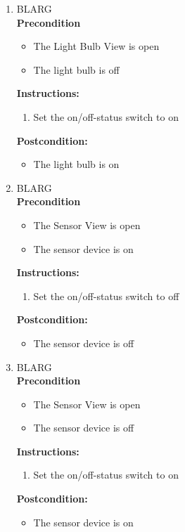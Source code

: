 \documentclass[a4paper]{article}
\newlength{\testlabellength}
\newenvironment{testlist}{\begin{enumerate}[label=\bfseries Instruction \thesubsection.\arabic* , labelindent=0pt, labelwidth=\testlabellength , leftmargin=2cm]}{\end{enumerate}}
\newenvironment{precondition}{
{\color{white}BLARG}\\ 
\textbf{Precondition}
\begin{itemize}[labelindent=0cm, labelwidth=2cm , leftmargin=1cm]
}
{\end{itemize}}
\newenvironment{instruction}{
\textbf{Instructions:}
\begin{enumerate}[label=\bfseries  \arabic*., labelindent=0cm, labelwidth=2cm , leftmargin=1cm]
}
{\end{enumerate}}
\newenvironment{postcondition}{
\textbf{Postcondition:}
\begin{itemize}[labelindent=0cm, labelwidth=2cm , leftmargin=1cm]
}
{\end{itemize}}
\begin{document}
\begin{appendices}
\begin{testlist}
	\item
		\begin{precondition}
			\item The Light Bulb View is open
			\item The light bulb is off
		\end{precondition}
		\begin{instruction}
			\item Set the on/off-status switch to on
		\end{instruction}
		\begin{postcondition}
			\item The light bulb is on
		\end{postcondition}

	\item
		\begin{precondition}
			\item The Sensor View is open
			\item The sensor device is on
		\end{precondition}
		\begin{instruction}
			\item Set the on/off-status switch to off
		\end{instruction}
		\begin{postcondition}
			\item The sensor device is off
		\end{postcondition}

	\item
		\begin{precondition}
			\item The Sensor View is open
			\item The sensor device is off
		\end{precondition}
		\begin{instruction}
			\item Set the on/off-status switch to on
		\end{instruction}
		\begin{postcondition}
			\item The sensor device is on
		\end{postcondition}


\end{testlist}
\end{appendices}
\end{document}
